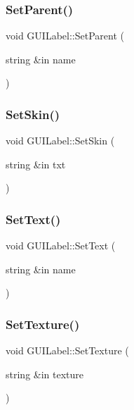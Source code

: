 \hypertarget{class_g_u_i_label_a40ab78494b4fd8826b65da3dd1ee1efa}{}\label{class_g_u_i_label_a40ab78494b4fd8826b65da3dd1ee1efa} 
\subsubsection{\texorpdfstring{Set\+Parent()}{SetParent()}}
{\footnotesize\ttfamily void G\+U\+I\+Label\+::\+Set\+Parent (\begin{DoxyParamCaption}\item[{string \&in}]{name }\end{DoxyParamCaption})}

\hypertarget{class_g_u_i_label_a817cf661e6f1ab77f324aa0ceea53c50}{}\label{class_g_u_i_label_a817cf661e6f1ab77f324aa0ceea53c50} 
\subsubsection{\texorpdfstring{Set\+Skin()}{SetSkin()}}
{\footnotesize\ttfamily void G\+U\+I\+Label\+::\+Set\+Skin (\begin{DoxyParamCaption}\item[{string \&in}]{txt }\end{DoxyParamCaption})}

\hypertarget{class_g_u_i_label_a8017096ee8d48e27cb2f86a6415454af}{}\label{class_g_u_i_label_a8017096ee8d48e27cb2f86a6415454af} 
\subsubsection{\texorpdfstring{Set\+Text()}{SetText()}}
{\footnotesize\ttfamily void G\+U\+I\+Label\+::\+Set\+Text (\begin{DoxyParamCaption}\item[{string \&in}]{name }\end{DoxyParamCaption})}

\hypertarget{class_g_u_i_label_a461c33dadf91124cc3a9b6d66a9cd000}{}\label{class_g_u_i_label_a461c33dadf91124cc3a9b6d66a9cd000} 
\subsubsection{\texorpdfstring{Set\+Texture()}{SetTexture()}}
{\footnotesize\ttfamily void G\+U\+I\+Label\+::\+Set\+Texture (\begin{DoxyParamCaption}\item[{string \&in}]{texture }\end{DoxyParamCaption})}

